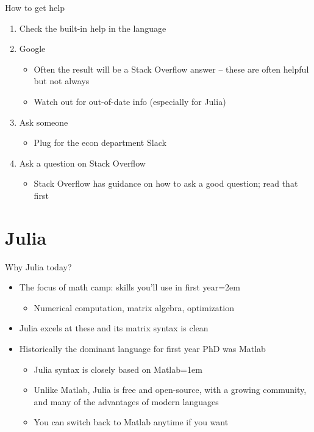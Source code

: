 \documentclass{beamer}
\begin{document}
\begin{frame}{How to get help}

\begin{enumerate}
    \item Check the built-in help in the language
    \item Google
    \begin{itemize}
        \item Often the result will be a Stack Overflow answer -- these are often helpful but not always
        \item Watch out for out-of-date info (especially for Julia)
    \end{itemize}
    \item Ask someone
    \begin{itemize}
        \item Plug for the econ department Slack
    \end{itemize}
    \item Ask a question on Stack Overflow
    \begin{itemize}
        \item Stack Overflow has guidance on how to ask a good question; read that first
    \end{itemize}
\end{enumerate}
\end{frame}

\section{Julia}

\begin{frame}{Why Julia today?}
\begin{itemize}
    \item The focus of math camp: skills you'll use in first year\itemsep=2em
    \begin{itemize}
      \item Numerical computation, matrix algebra, optimization
    \end{itemize}
    \item Julia excels at these and its matrix syntax is clean
    \item<2-> Historically the dominant language for first year PhD was Matlab
    \begin{itemize}
        \item Julia syntax is closely based on Matlab\itemsep=1em
        \item Unlike Matlab, Julia is free and open-source, with a growing community, and many of the advantages of modern languages
        \item You can switch back to Matlab anytime if you want
    \end{itemize}
\end{itemize}
\end{frame}
\end{document}

